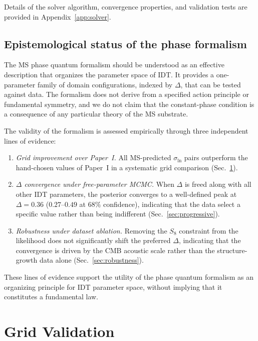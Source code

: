 \documentclass[aps,prd,twocolumn,superscriptaddress,nofootinbib]{revtex4-2}
\newcommand{\sln}{\sigma_{\ln}}
\begin{document}
Details of the solver algorithm, convergence properties, and
validation tests are provided in Appendix~\ref{app:solver}.

\subsection{Epistemological status of the phase formalism}
\label{sec:epistemological}

The MS phase quantum formalism should be understood as an effective
description that organizes the parameter space of IDT. It provides a
one-parameter family of domain configurations, indexed by $\Delta$,
that can be tested against data. The formalism does not derive from a
specified action principle or fundamental symmetry, and we do not
claim that the constant-phase condition is a consequence of any
particular theory of the MS substrate.

The validity of the formalism is assessed empirically through three
independent lines of evidence:

\begin{enumerate}
\item \textit{Grid improvement over Paper~I.} All MS-predicted
  $\sln$ pairs outperform the hand-chosen values of Paper~I in a
  systematic grid comparison (Sec.~\ref{sec:grid}).
\item \textit{$\Delta$ convergence under free-parameter MCMC.} When
  $\Delta$ is freed along with all other IDT parameters, the posterior
  converges to a well-defined peak at $\Delta = 0.36$ ($0.27$--$0.49$
  at $68\%$ confidence), indicating that the data select a specific
  value rather than being indifferent (Sec.~\ref{sec:progressive}).
\item \textit{Robustness under dataset ablation.} Removing the $S_8$
  constraint from the likelihood does not significantly shift the
  preferred $\Delta$, indicating that the convergence is driven by the
  CMB acoustic scale rather than the structure-growth data alone
  (Sec.~\ref{sec:robustness}).
\end{enumerate}

These lines of evidence support the utility of the phase quantum
formalism as an organizing principle for IDT parameter space, without
implying that it constitutes a fundamental law.

\section{Grid Validation}
\label{sec:grid}
\end{document}
